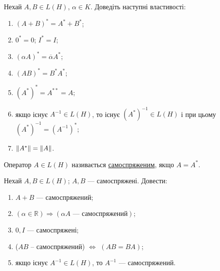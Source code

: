 \begin{exercise}
    Нехай $A, B \in L(H)$, $\alpha \in K$. Доведіть наступні властивості:
    \begin{enumerate}[label=\ukr*)]
        \item $(A+B)^* = A^* + B^*$;
        \item $0^*=0$; $I^* = I$;
        \item $(\alpha A)^* = \overline{\alpha}A^*$;
        \item $(AB)^{*} = B^{*} A^{*}$;
        \item $(A^*)^* = A^{**} = A$;
        \item якщо існує $A^{-1} \in L(H)$, то існує $(A^*)^{-1} \in 
        L(H)$ і при цьому $(A^*)^{-1} = (A^{-1})^*$;
        \item $\left\lVert A^*\right\rVert = \left\lVert A\right\rVert$.
    \end{enumerate}
\end{exercise}

\begin{theory}
    Оператор $A \in L(H)$ називається \uline{самоспряженим}, якщо 
    $A = A^*$.
\end{theory}

\begin{exercise}
    Нехай $A, B \in L(H)$; $A, B$ --- самоспряжені. Довести:
    \begin{enumerate}[label=\ukr*)]
        \item $A+B$ --- самоспряжений;
        \item $\left(\alpha \in \mathbb{R}\right) \Rightarrow \left(\alpha A \text{ --- самоспряжений}\right)$;
        \item $0, I$ --- самоспряжені;
        \item ($AB$ -- самоспряжений) $\Leftrightarrow$ $(AB = BA)$;
        \item якщо існує $A^{-1} \in L(H)$, то $A^{-1}$ --- 
        самоспряжений.
    \end{enumerate}
\end{exercise}

